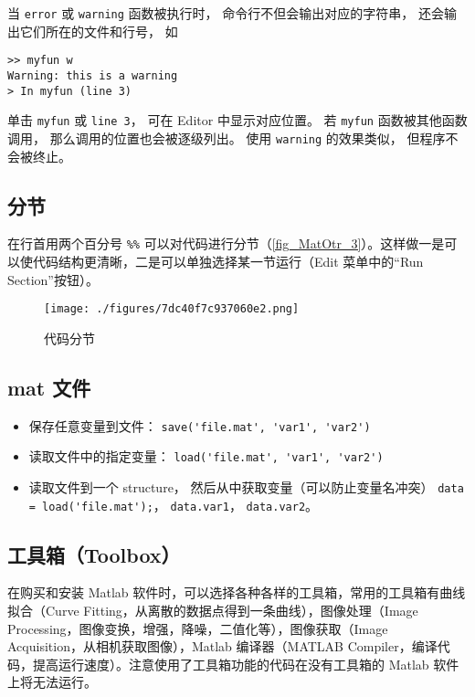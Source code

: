 当 \verb|error| 或 \verb|warning| 函数被执行时， 命令行不但会输出对应的字符串， 还会输出它们所在的文件和行号， 如
\begin{lstlisting}[language=matlabC]
>> myfun w
Warning: this is a warning
> In myfun (line 3)
\end{lstlisting}
单击 \verb|myfun| 或 \verb|line 3|， 可在 Editor 中显示对应位置。 若 \verb|myfun| 函数被其他函数调用， 那么调用的位置也会被逐级列出。 使用 \verb|warning| 的效果类似， 但程序不会被终止。

\subsection{分节}
在行首用两个百分号 \verb|%%| 可以对代码进行分节（\autoref{fig_MatOtr_3}）。这样做一是可以使代码结构更清晰，二是可以单独选择某一节运行（Edit 菜单中的“Run Section”按钮）。
\begin{figure}[ht]
\centering
\texttt{[image: ./figures/7dc40f7c937060e2.png]}
\caption{代码分节}\label{fig_MatOtr_3}
\end{figure}

\subsection{mat 文件}
\begin{itemize}
\item 保存任意变量到文件： \verb|save('file.mat', 'var1', 'var2')|
\item 读取文件中的指定变量： \verb|load('file.mat', 'var1', 'var2')|
\item 读取文件到一个 structure， 然后从中获取变量（可以防止变量名冲突） \verb|data = load('file.mat');|， \verb|data.var1|， \verb|data.var2|。
\end{itemize}


\subsection{工具箱（Toolbox）}
在购买和安装 Matlab 软件时，可以选择各种各样的工具箱，常用的工具箱有曲线拟合（Curve Fitting，从离散的数据点得到一条曲线），图像处理（Image Processing，图像变换，增强，降噪，二值化等），图像获取（Image Acquisition，从相机获取图像），Matlab 编译器（MATLAB Compiler，编译代码，提高运行速度）。注意使用了工具箱功能的代码在没有工具箱的 Matlab 软件上将无法运行。




